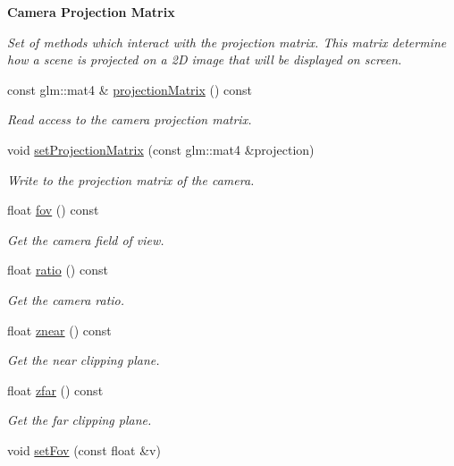 \begin{Indent}{\bf Camera Projection Matrix}\par
{\em Set of methods which interact with the projection matrix. This matrix determine how a scene is projected on a 2\+D image that will be displayed on screen. }\begin{DoxyCompactItemize}
\item 
const glm\+::mat4 \& \hyperlink{classCamera_adeda5ac08b751d6122d5f280769617a1}{projection\+Matrix} () const 
\begin{DoxyCompactList}\small\item\em Read access to the camera projection matrix. \end{DoxyCompactList}\item 
void \hyperlink{classCamera_a25474205988645b3792f1c6cffad95af}{set\+Projection\+Matrix} (const glm\+::mat4 \&projection)
\begin{DoxyCompactList}\small\item\em Write to the projection matrix of the camera. \end{DoxyCompactList}\item 
float \hyperlink{classCamera_aa2af35287b83a29333b0ae51ebaa2f4b}{fov} () const 
\begin{DoxyCompactList}\small\item\em Get the camera field of view. \end{DoxyCompactList}\item 
float \hyperlink{classCamera_aa7757f7ff602b864472fe6be5c7a23ac}{ratio} () const 
\begin{DoxyCompactList}\small\item\em Get the camera ratio. \end{DoxyCompactList}\item 
float \hyperlink{classCamera_ae2231c2ee1a4a356ef8a7e1003f04998}{znear} () const 
\begin{DoxyCompactList}\small\item\em Get the near clipping plane. \end{DoxyCompactList}\item 
float \hyperlink{classCamera_a2dba7a46727c9db0ee663751e0d4d2b1}{zfar} () const 
\begin{DoxyCompactList}\small\item\em Get the far clipping plane. \end{DoxyCompactList}\item 
void \hyperlink{classCamera_a06d62ccd30da0b6c46a837ee67c5a6b8}{set\+Fov} (const float \&v)

\end{DoxyCompactItemize}
\end{Indent}
